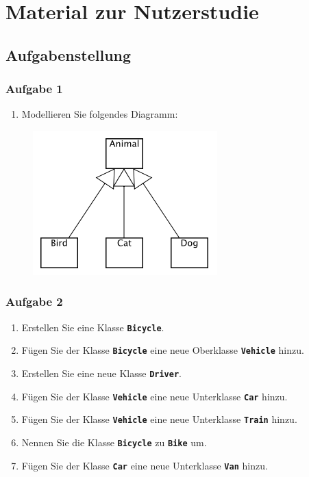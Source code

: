 
\appendix

\chapter{Material zur Nutzerstudie}

\section{Aufgabenstellung}

\subsection*{Aufgabe 1}

\begin{enumerate}
    \item Modellieren Sie folgendes Diagramm:
\end{enumerate}

\begin{figure}[hbt]
    \includegraphics[scale=0.9]{../user-study-exercises/resources/exercise-1}
\end{figure}

\subsection*{Aufgabe 2}
\begin{enumerate}
    \item Erstellen Sie eine Klasse \texttt{\textbf{Bicycle}}.
    \item Fügen Sie der Klasse \texttt{\textbf{Bicycle}} eine neue Oberklasse \texttt{\textbf{Vehicle}} hinzu.
    \item Erstellen Sie eine neue Klasse \texttt{\textbf{Driver}}.
    \item Fügen Sie der Klasse \texttt{\textbf{Vehicle}} eine neue Unterklasse \texttt{\textbf{Car}} hinzu.
    \item Fügen Sie der Klasse \texttt{\textbf{Vehicle}} eine neue Unterklasse \texttt{\textbf{Train}} hinzu.
    \item Nennen Sie die Klasse \texttt{\textbf{Bicycle}} zu \texttt{\textbf{Bike}} um.
    \item Fügen Sie der Klasse \texttt{\textbf{Car}} eine neue Unterklasse \texttt{\textbf{Van}} hinzu.
\end{enumerate}

